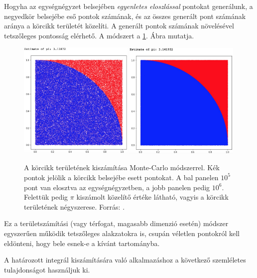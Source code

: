 \documentclass[12pt]{article}
\theoremstyle{plain}
\begin{document}
Hogyha az egységnégyzet belsejében {\em egyenletes eloszlással} pontokat generálunk, a negyedkör belsejébe eső pontok számának, és az összes generált pont számának aránya a körcikk területét közelíti. A generált pontok számának növelésével tetszőleges pontosság elérhető. A módszert a \ref{fig:1}. Ábra mutatja. 
\begin{figure}[h!]
    \centering
    \includegraphics[width = 0.49\textwidth]{media/ht.jpeg}
    \includegraphics[width = 0.49\textwidth]{media/million.jpeg}
    \caption{A körcikk területének kiszámítása Monte-Carlo módszerrel. Kék pontok jelölik a körcikk belsejébe esett pontokat. A bal panelen $10^5$ pont van elosztva az egységnégyzetben, a jobb panelen pedig $10^6$. Felettük pedig $\pi$ kiszámolt közelítő értéke látható, vagyis a körcikk területének négyszerese. Forrás: \cite{mc}. }
    \label{fig:1}
\end{figure}
Ez a területszámítási (vagy térfogat, magasabb dimenzió esetén) módszer egyszerűen működik tetszőleges alakzatokra is, csupán véletlen pontokról kell eldönteni, hogy bele esnek-e a kívánt tartományba. 

A határozott integrál kiszámítására való alkalmazáshoz a következő szemléletes tulajdonságot használjuk ki. 
\end{document}
